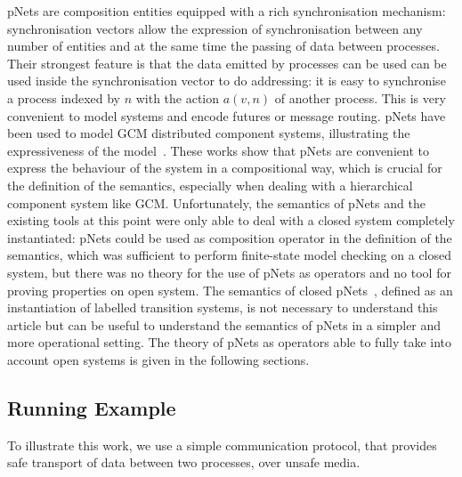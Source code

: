 \documentclass{lmcs}
\begin{document}
pNets are composition entities equipped with a rich synchronisation mechanism: synchronisation vectors allow the expression of synchronisation between any number of entities and at the same time the passing of data between processes. Their strongest feature is that the data emitted by processes can be used can be used inside the synchronisation vector to do addressing: it is easy to synchronise a process indexed by $n$ with the action $a(v,n)$ of another process. This is very convenient to model systems and encode futures or message routing. pNets have been used to model GCM distributed component systems, illustrating the expressiveness of the model~\cite{AmeurBoulifa2017}. These works show that pNets are convenient to express the behaviour of the system in a compositional way, which is crucial for the definition of the semantics, especially when dealing with a hierarchical component system like GCM. Unfortunately, the semantics of pNets and the existing tools at this point were only able to deal with a closed system completely instantiated: pNets could be used as composition operator in the definition of the semantics, which was sufficient to perform finite-state model checking on a closed system, but there was no theory for the use of pNets as operators and no tool for proving properties on open system. The semantics of closed pNets~\cite{AmeurBoulifa2017}, defined as an instantiation of labelled transition systems, is not necessary to understand this article but can be useful to  understand the semantics of pNets in a simpler and more operational setting. The theory of pNets as operators able to fully take into account open systems is given in the following sections.

\subsection{Running Example}
To illustrate this work, we use a simple communication protocol, that provides safe transport of data between two processes, over unsafe media. 
\end{document}
